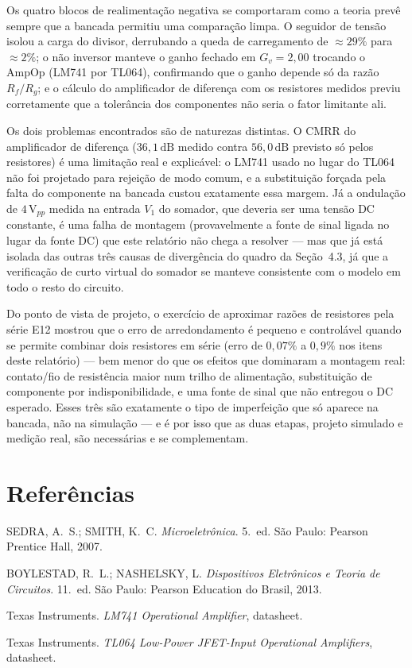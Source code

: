 \documentclass[11pt,a4paper]{article}
\begin{document}
Os quatro blocos de realimentação negativa se comportaram como a teoria prevê sempre que a
bancada permitiu uma comparação limpa. O seguidor de tensão isolou a carga do divisor,
derrubando a queda de carregamento de ${\approx}29\%$ para ${\approx}2\%$; o não inversor
manteve o ganho fechado em $G_v{=}2{,}00$ trocando o AmpOp (LM741 por TL064), confirmando que o
ganho depende só da razão $R_f/R_g$; e o cálculo do amplificador de diferença com os resistores
medidos previu corretamente que a tolerância dos componentes não seria o fator limitante ali.

Os dois problemas encontrados são de naturezas distintas. O CMRR do amplificador de diferença
($36{,}1\,\text{dB}$ medido contra $56{,}0\,\text{dB}$ previsto só pelos resistores) é uma
limitação real e explicável: o LM741 usado no lugar do TL064 não foi projetado para rejeição de
modo comum, e a substituição forçada pela falta do componente na bancada custou exatamente essa
margem. Já a ondulação de $4\,\text{V}_{pp}$ medida na entrada $V_1$ do somador, que deveria ser
uma tensão DC constante, é uma falha de montagem (provavelmente a fonte de sinal ligada no
lugar da fonte DC) que este relatório não chega a resolver — mas que já está isolada das outras
três causas de divergência do quadro da Seção~4.3, já que a verificação de curto virtual do
somador se manteve consistente com o modelo em todo o resto do circuito.

Do ponto de vista de projeto, o exercício de aproximar razões de resistores pela série E12
mostrou que o erro de arredondamento é pequeno e controlável quando se permite combinar dois
resistores em série (erro de $0{,}07\%$ a $0{,}9\%$ nos itens deste relatório) — bem menor do
que os efeitos que dominaram a montagem real: contato/fio de resistência maior num trilho de
alimentação, substituição de componente por indisponibilidade, e uma fonte de sinal que não
entregou o DC esperado. Esses três são exatamente o tipo de imperfeição que só aparece na
bancada, não na simulação — e é por isso que as duas etapas, projeto simulado e medição real,
são necessárias e se complementam.

\section{Referências}

\begin{referencias}
\item SEDRA, A.~S.; SMITH, K.~C. \emph{Microeletrônica}. 5.~ed. São Paulo: Pearson
      Prentice Hall, 2007.
\item BOYLESTAD, R.~L.; NASHELSKY, L. \emph{Dispositivos Eletrônicos e Teoria de
      Circuitos}. 11.~ed. São Paulo: Pearson Education do Brasil, 2013.
\item Texas Instruments. \emph{LM741 Operational Amplifier}, datasheet.
\item Texas Instruments. \emph{TL064 Low-Power JFET-Input Operational Amplifiers}, datasheet.
\end{referencias}
\end{document}
